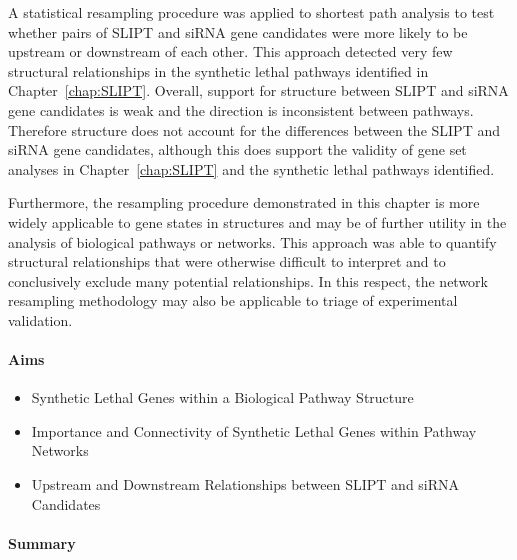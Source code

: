 A statistical resampling procedure was applied to \gls{shortest path} analysis to test whether pairs of \gls{SLIPT} and \gls{siRNA} gene candidates were more likely to be upstream or downstream of each other. This approach detected very few structural relationships in the \gls{synthetic lethal} pathways identified in Chapter~\ref{chap:SLIPT}. Overall, support for  structure between \gls{SLIPT} and \gls{siRNA} gene candidates is weak and the direction is inconsistent between pathways. Therefore  structure does not account for the differences between the \gls{SLIPT} and \gls{siRNA} gene candidates, although this does support the validity of gene set analyses in Chapter~\ref{chap:SLIPT} and the \gls{synthetic lethal} pathways identified.

Furthermore, the resampling procedure demonstrated in this chapter is more widely applicable to gene states in  structures and may be of further utility in the analysis of biological pathways or networks. This approach was able to quantify structural relationships that were otherwise difficult to interpret and to conclusively exclude many potential relationships. In this respect, the network resampling methodology may also be applicable to triage of experimental validation.

\clearpage

\iffalse
\paragraph{Aims}

  \begin{itemize}
   \item Synthetic Lethal Genes within a Biological Pathway Structure
   
   \bigskip
   
   \item Importance and Connectivity of Synthetic Lethal Genes within Pathway Networks
   
   \bigskip
   
   \item Upstream and Downstream Relationships between SLIPT and \gls{siRNA} Candidates
  \end{itemize}

\paragraph{Summary}

